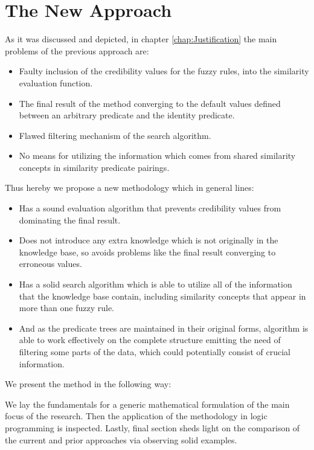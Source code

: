 \documentclass[egilmezThesis.tex]{subfiles}
\begin{document}
\chapter{The New Approach}
\label{chap:MA}

As it was discussed and depicted, in chapter \ref{chap:Justification} the main problems of the previous approach are:
\begin{itemize}
\item Faulty inclusion of the credibility values for the fuzzy rules, into the similarity evaluation function.
\item The final result of the method converging to the default values defined between an arbitrary predicate and the identity predicate.
\item Flawed filtering mechanism of the search algorithm.
\item No means for utilizing the information which comes from shared similarity concepts in similarity predicate pairings.
\end{itemize}

Thus hereby we propose a new methodology which in general lines:
\begin{itemize}
\item Has a sound evaluation algorithm that prevents credibility values from dominating the final result.
\item Does not introduce any extra knowledge which is not originally in the knowledge base, so avoids problems like the final result converging to erroneous values.
\item Has a solid search algorithm which is able to utilize all of the information that the knowledge base contain, including similarity concepts that appear in more than one fuzzy rule.
\item And as the predicate trees are maintained in their original forms, algorithm is able to work effectively on the  complete structure emitting the need of filtering some parts of the data, which could potentially consist of crucial information.
\end{itemize}

We present the method in the following way:

We lay the fundamentals for a generic mathematical formulation of the main focus of the research. Then the application of the methodology in logic programming is inspected. Lastly, final section sheds light on the comparison of the current and prior approaches via observing solid examples.
\end{document}

